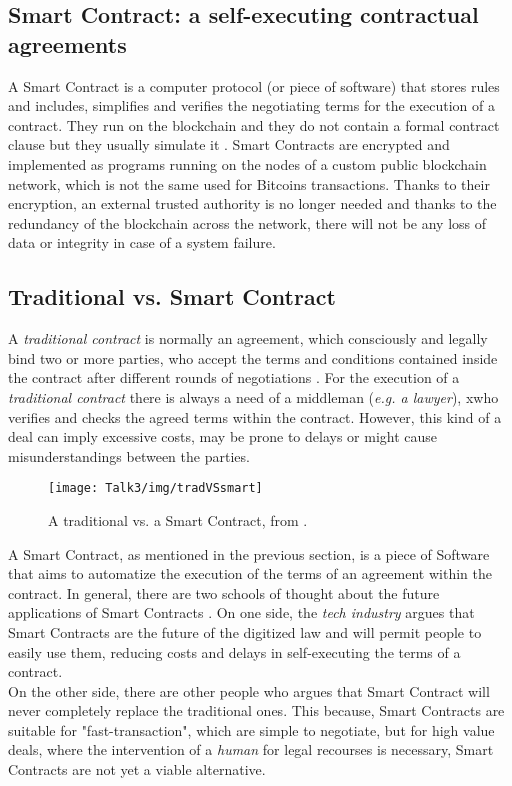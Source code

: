 \subsection{Smart Contract: a self-executing contractual agreements}
A Smart Contract is a computer protocol (or piece of software) that stores rules and includes, simplifies and verifies the negotiating terms for the execution of a contract. They run on the blockchain \cite{paper3} and they do not contain a formal contract clause but they usually simulate it \cite{SC1}. Smart Contracts are encrypted and implemented as programs running on the nodes of a custom public blockchain network, which is not the same used for Bitcoins transactions. Thanks to their encryption, an external trusted authority is no longer needed and thanks to the redundancy of the blockchain across the network, there will not be any loss of data or integrity in case of a system failure.

\subsection{Traditional vs. Smart Contract}
A \textit{traditional contract} is normally an agreement, which consciously and legally bind two or more parties, who accept the terms and conditions contained inside the contract after different rounds of negotiations \cite{SC12,SC13}. For the execution of a \textit{traditional contract} there is always a need of a middleman (\textit{e.g. a lawyer}), xwho verifies and checks the agreed terms within the contract. However, this kind of a deal can imply excessive costs, may be prone to delays or might cause misunderstandings between the parties. 
           \begin{figure}[H]
         \begin{center}
         \texttt{[image: Talk3/img/tradVSsmart]}
         \end{center}
         \caption{A traditional vs. a Smart Contract, from \cite{SC2}.}
         \label{label}
       \end{figure}
A Smart Contract, as mentioned in the previous section, is a piece of Software that aims to automatize the execution of the terms of an agreement within the contract.
In general, there are two schools of thought about the future applications of Smart Contracts \cite{future}. On one side, the \textit{tech industry} argues that Smart Contracts are the future of the digitized law and will permit people to easily use them, reducing costs and delays in self-executing the terms of a contract. \\
On the other side, there are other people who argues that Smart Contract will never completely replace the traditional ones. This because, Smart Contracts are suitable for "fast-transaction", which are simple to negotiate, but for high value deals, where the intervention of a \textit{human} for legal recourses is necessary, Smart Contracts are not yet a viable alternative.





